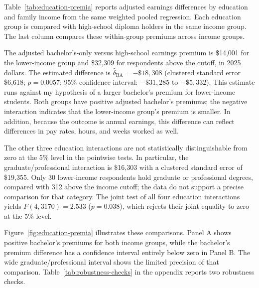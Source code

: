 \documentclass[12pt,letterpaper]{article}
\begin{document}
Table~\ref{tab:education-premia} reports adjusted earnings differences by education
and family income from the same weighted pooled regression. Each education group
is compared with high-school diploma holders in the same income group. The last
column compares these within-group premiums across income groups.\newline


The adjusted bachelor's-only versus high-school earnings premium is \$14,001 for
the lower-income group and \$32,309 for respondents above the cutoff, in 2025 dollars.
The estimated difference is $\hat\delta_{\mathrm{BA}}=-\$18,308$
(clustered standard error \$6,618; $p=0.0057$; 95\% confidence interval:
$-\$31,285$ to $-\$5,332$). This estimate runs against my hypothesis of a larger
bachelor's premium for lower-income students. Both groups have positive adjusted
bachelor's premiums; the negative interaction indicates that the lower-income
group's premium is smaller. In addition, because the outcome is annual earnings, 
this difference can reflect differences in pay rates, hours, and weeks worked as well.\newline

The other three education interactions are not statistically distinguishable from
zero at the 5\% level in the pointwise tests. In particular, the graduate/professional
interaction is \$16,303 with a clustered standard error of \$19,355. Only 30
lower-income respondents hold graduate or professional degrees, compared with
312 above the income cutoff; the data do not support a precise comparison for
that category. The joint test of all four education interactions yields
$F(4,3170)=2.533$ ($p=0.038$), which rejects their joint equality to zero
at the 5\% level.\newline

Figure~\ref{fig:education-premia} illustrates these comparisons. Panel A shows
positive bachelor's premiums for both income groups, while the bachelor's
premium difference has a confidence interval entirely below zero in Panel B.
The wide graduate/professional interval shows the limited precision of that
comparison. Table~\ref{tab:robustness-checks} in the appendix reports two
robustness checks.
\end{document}
